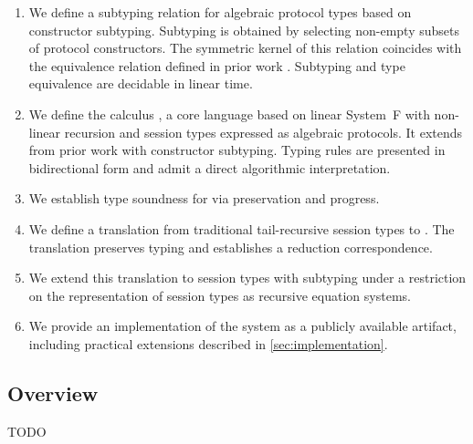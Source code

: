 \begin{enumerate}

\item
We define a subtyping relation for algebraic protocol types based on
constructor subtyping. Subtyping is obtained by selecting non-empty
subsets of protocol constructors. The symmetric kernel of this
relation coincides with the equivalence relation defined in prior work
\cite{DBLP:journals/pacmpl/MordidoS0V23}.  Subtyping and type
equivalence are decidable in linear time.

\item
We define the calculus \algstsub, a core language based on linear
System~F with non-linear recursion and session types expressed as
algebraic protocols. It extends \algst from prior work with constructor
subtyping. Typing rules are presented in bidirectional
form and admit a direct algorithmic interpretation.

\item
We establish type soundness for \algstsub via preservation and
progress.

\item
We define a translation from traditional tail-recursive session
types to \algst.  The translation preserves typing and establishes
a reduction correspondence.

\item
We extend this translation to session types with subtyping under a
restriction on the representation of session types as recursive
equation systems.

\item
We provide an implementation of the system as a publicly available
artifact, including practical extensions described in
\cref{sec:implementation}.

\end{enumerate}



\subsection*{Overview}
\label{sec:overview}

TODO

